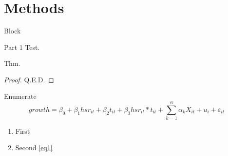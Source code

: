\documentclass[11pt]{SWJTUBeamer}
\begin{document}
\section{Methods}

\begin{frame}{Block}
    \begin{block}{Part 1}
        Test.
    \end{block}
    \begin{theorem}[Thm 1]
        Thm.
    \end{theorem}
    \begin{proof}
        Q.E.D.
    \end{proof}
\end{frame}

\begin{frame}{Enumerate}
    \begin{equation}
        growth=\beta_{0}+\beta_{1}hsr_{it}+\beta_{2}t_{it}+\beta_{3}hsr_{it}*t_{it}+\sum^{6}_{k=1}\alpha_{k}X_{it}+u_{i}+\varepsilon_{it}\label{eq1}
    \end{equation}
    \begin{enumerate}
        \item First 
        \item Second \eqref{eq1}
    \end{enumerate}
\end{frame}
\end{document}
